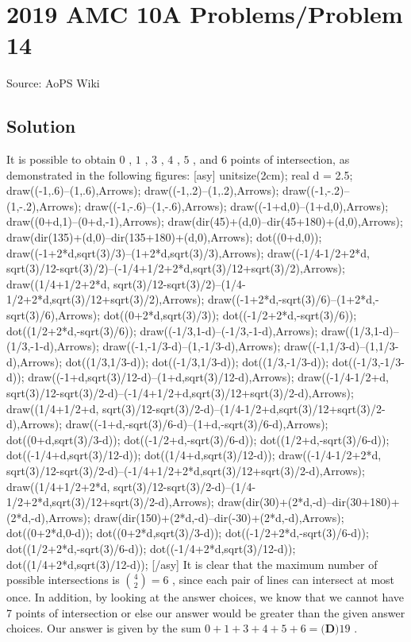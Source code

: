 \documentclass[12pt]{article}
\begin{document}
\section*{{2019 AMC 10A Problems/Problem 14}}
Source: AoPS Wiki

\subsection*{Solution}
It is possible to obtain $0$ , $1$ , $3$ , $4$ , $5$ , and $6$ points of intersection, as demonstrated in the following figures: [asy] unitsize(2cm); real d = 2.5; draw((-1,.6)--(1,.6),Arrows); draw((-1,.2)--(1,.2),Arrows); draw((-1,-.2)--(1,-.2),Arrows); draw((-1,-.6)--(1,-.6),Arrows); draw((-1+d,0)--(1+d,0),Arrows); draw((0+d,1)--(0+d,-1),Arrows); draw(dir(45)+(d,0)--dir(45+180)+(d,0),Arrows); draw(dir(135)+(d,0)--dir(135+180)+(d,0),Arrows); dot((0+d,0)); draw((-1+2*d,sqrt(3)/3)--(1+2*d,sqrt(3)/3),Arrows); draw((-1/4-1/2+2*d, sqrt(3)/12-sqrt(3)/2)--(-1/4+1/2+2*d,sqrt(3)/12+sqrt(3)/2),Arrows); draw((1/4+1/2+2*d, sqrt(3)/12-sqrt(3)/2)--(1/4-1/2+2*d,sqrt(3)/12+sqrt(3)/2),Arrows); draw((-1+2*d,-sqrt(3)/6)--(1+2*d,-sqrt(3)/6),Arrows); dot((0+2*d,sqrt(3)/3)); dot((-1/2+2*d,-sqrt(3)/6)); dot((1/2+2*d,-sqrt(3)/6)); draw((-1/3,1-d)--(-1/3,-1-d),Arrows); draw((1/3,1-d)--(1/3,-1-d),Arrows); draw((-1,-1/3-d)--(1,-1/3-d),Arrows); draw((-1,1/3-d)--(1,1/3-d),Arrows); dot((1/3,1/3-d)); dot((-1/3,1/3-d)); dot((1/3,-1/3-d)); dot((-1/3,-1/3-d)); draw((-1+d,sqrt(3)/12-d)--(1+d,sqrt(3)/12-d),Arrows); draw((-1/4-1/2+d, sqrt(3)/12-sqrt(3)/2-d)--(-1/4+1/2+d,sqrt(3)/12+sqrt(3)/2-d),Arrows); draw((1/4+1/2+d, sqrt(3)/12-sqrt(3)/2-d)--(1/4-1/2+d,sqrt(3)/12+sqrt(3)/2-d),Arrows); draw((-1+d,-sqrt(3)/6-d)--(1+d,-sqrt(3)/6-d),Arrows); dot((0+d,sqrt(3)/3-d)); dot((-1/2+d,-sqrt(3)/6-d)); dot((1/2+d,-sqrt(3)/6-d)); dot((-1/4+d,sqrt(3)/12-d)); dot((1/4+d,sqrt(3)/12-d)); draw((-1/4-1/2+2*d, sqrt(3)/12-sqrt(3)/2-d)--(-1/4+1/2+2*d,sqrt(3)/12+sqrt(3)/2-d),Arrows); draw((1/4+1/2+2*d, sqrt(3)/12-sqrt(3)/2-d)--(1/4-1/2+2*d,sqrt(3)/12+sqrt(3)/2-d),Arrows); draw(dir(30)+(2*d,-d)--dir(30+180)+(2*d,-d),Arrows); draw(dir(150)+(2*d,-d)--dir(-30)+(2*d,-d),Arrows); dot((0+2*d,0-d)); dot((0+2*d,sqrt(3)/3-d)); dot((-1/2+2*d,-sqrt(3)/6-d)); dot((1/2+2*d,-sqrt(3)/6-d)); dot((-1/4+2*d,sqrt(3)/12-d)); dot((1/4+2*d,sqrt(3)/12-d)); [/asy] It is clear that the maximum number of possible intersections is ${4 \choose 2} = 6$ , since each pair of lines can intersect at most once. In addition, by looking at the answer choices, we know that we cannot have 7 points of intersection or else our answer would be greater than the given answer choices. Our answer is given by the sum $0+1+3+4+5+6=\boxed{\textbf{(D)} 19}$ .
\end{document}
